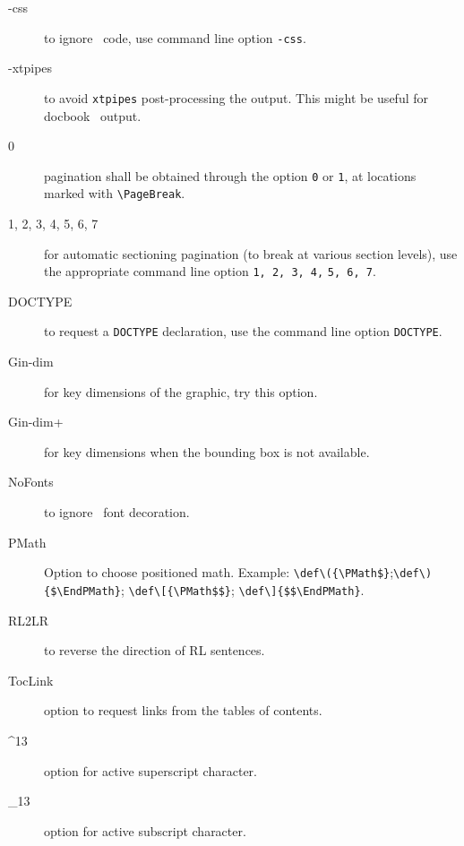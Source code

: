 \begin{description}

\item[-css] to ignore \css\ code, use command line option \verb=-css=.

\item[-xtpipes] to avoid \verb=xtpipes= post-processing the
  output. This might be useful for docbook \xml\ output.


\item[0] pagination shall be obtained through the option \verb=0= or
  \verb=1=, at locations marked with \verb=\PageBreak=.

\item[1, 2, 3, 4, 5, 6, 7] for automatic sectioning pagination (to
  break at various section levels), use the appropriate command line
  option \verb=1, 2, 3, 4,= \verb=5, 6, 7=.

\item[DOCTYPE] to request a \verb=DOCTYPE= declaration, use the
  command line option \verb=DOCTYPE=.

\item[Gin-dim] for key dimensions of the graphic, try this option.

\item[Gin-dim+] for key dimensions when the bounding box is not
  available.

\item[NoFonts] to ignore \css\ font decoration.

\item[PMath] Option to choose positioned math. Example: 
  \verb=\def\({\PMath$}=;\allowbreak \verb=\def\){$\EndPMath}=;
  \verb=\def\[{\PMath$$}=; \verb=\def\]{$$\EndPMath}=.

\item[RL2LR] to reverse the direction of RL sentences.


\item[TocLink] option to request links from the tables of contents.
  
\item[\textasciicircum 13] option for active superscript character.

\item[\_13] option for active subscript character.


\end{description}

